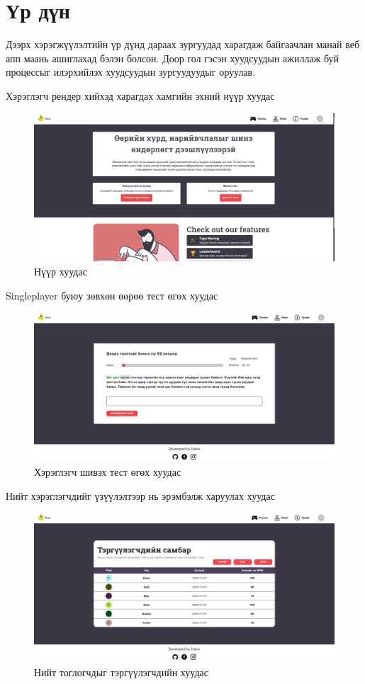 \chapter{Үр дүн}

Дээрх хэрэгжүүлэлтийн үр дүнд дараах зургуудад харагдаж байгаачлан манай веб апп маань ашиглахад бэлэн болсон. Доор гол гэсэн хуудсуудын ажиллаж буй процессыг илэрхийлэх хуудсуудын зургуудуудыг оруулав.


Хэрэглэгч рендер хийхэд харагдах хамгийн эхний нүүр хуудас
\begin{figure}[h]
	\centering
	\includegraphics[width=13cm]{images/result/homepage.png}
	\caption{Нүүр хуудас}
	\label{fig:results}
\end{figure}

Singleplayer буюу зөвхөн өөрөө тест өгөх хуудас
\begin{figure}[h]
	\centering
	\includegraphics[width=13cm]{images/result/playpage.png}
	\caption{Хэрэглэгч шивэх тест өгөх хуудас}
	\label{fig:results}
\end{figure}

Нийт хэрэглэгчдийг үзүүлэлтээр нь эрэмбэлж харуулах хуудас
\begin{figure}[h]
	\centering
	\includegraphics[width=13cm]{images/result/rankpage.png}
	\caption{Нийт тоглогчдыг тэргүүлэгчдийн хуудас}
	\label{fig:results}
\end{figure}

